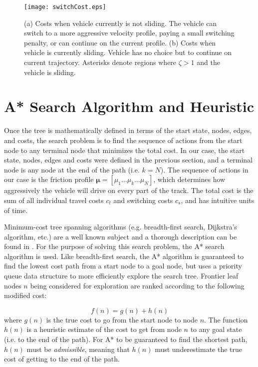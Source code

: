 {{{ \begin{figure}[tb]
\centering
\texttt{[image: switchCost.eps]}
\caption[Costs when vehicle is and is not sliding.]{(a) Costs when vehicle currently is not sliding. The vehicle can switch to a more aggressive velocity profile, paying a small
switching penalty, or can continue on the current profile. (b) Costs when vehicle is currently sliding. Vehicle has no choice but to continue on current
trajectory. Asterisks denote regions where $\zeta > 1$ and the vehicle is sliding.}
\label{fig:swCost}
\end{figure} 

\section{A* Search Algorithm and Heuristic}
\label{sec:ch5astarheuristic}

Once the tree is mathematically defined in terms of the start state, nodes, edges, and costs, the search problem is to find the sequence
of actions from the start node to any terminal node that minimizes the total cost. In our case, the start state, nodes, edges
and costs were defined in the previous section, and a terminal node is any node at the end of the path (i.e. $k = N$). The sequence
of actions in our case is the friction profile $\mathbf{\mu} = [\mu_1 \hdots \mu_k \hdots \mu_N]$, which determines how
aggressively the vehicle will drive on every part of the track. The total cost is the sum of all individual travel costs $c_t$ and switching costs
$c_s$, and has intuitive units of time. 

Minimum-cost tree spanning algorithms (e.g. breadth-first search, Dijkstra's algorithm, etc.) are a well known subject and a thorough description
can be found in \cite{aibook}. For the purpose of solving this search problem, the A* search algorithm is used. 
Like breadth-first search, the A* algorithm is guaranteed to find the lowest cost path from a start node to a goal node, 
but uses a priority queue data structure to more efficiently explore the search tree. Frontier leaf nodes $n$ being
considered for exploration are ranked according to the following modified cost:

\begin{equation}
f(n) = g(n) + h(n)
\end{equation}
where $g(n)$ is the true cost to go from the start node to node $n$. The function $h(n)$ is a heuristic estimate of the cost to get from node $n$ to any goal state (i.e. to the end of the
path). For A* to be guaranteed to find the shortest path, $h(n)$ must be \textit{admissible}, meaning that $h(n)$ must underestimate the
true cost of getting to the end of the path. 

}}}
